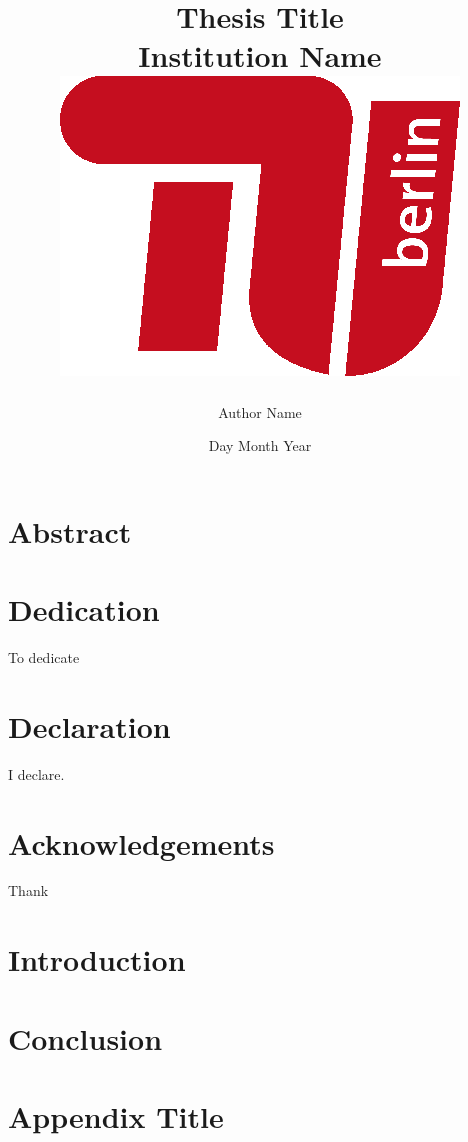 \documentclass[a4paper,12pt]{report}
\title{
	{Thesis Title}\\
	{\large Institution Name}\\
	{\includegraphics{tu_logo.png}}
}
\author{Author Name}
\date{Day Month Year}
\begin{document}
\maketitle

\chapter*{Abstract}


\chapter*{Dedication}
To dedicate

\chapter*{Declaration}
I declare.

\chapter*{Acknowledgements}
Thank

\tableofcontents

\chapter{Introduction}


\chapter{Conclusion}


\appendix

\chapter{Appendix Title}

\end{document}

